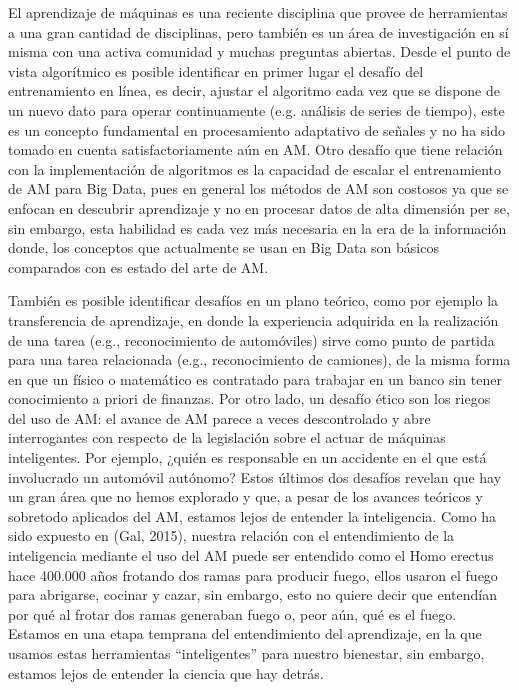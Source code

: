 El aprendizaje de máquinas es una reciente disciplina que provee de herramientas a una gran cantidad de disciplinas, pero también es un área de investigación en sí misma con una activa comunidad y muchas preguntas abiertas. Desde el punto de vista algorítmico es posible identificar en primer lugar el desafío del entrenamiento en línea, es decir, ajustar el algoritmo cada vez que se dispone de un nuevo dato para operar continuamente (e.g. análisis de series de tiempo), este es un concepto fundamental en procesamiento adaptativo de señales y no ha sido tomado en cuenta satisfactoriamente aún en AM. Otro desafío que tiene relación con la implementación de algoritmos es la capacidad de escalar el entrenamiento de AM para Big Data,  pues en general los métodos de AM son costosos ya que se enfocan en descubrir aprendizaje y no en procesar datos de alta dimensión per se, sin embargo, esta habilidad es cada vez más necesaria en la era de la información donde, los conceptos que actualmente se usan en Big Data son básicos comparados con es estado del arte de AM.

También es posible identificar desafíos en un plano teórico, como por ejemplo la transferencia de aprendizaje, en donde la experiencia adquirida en la realización de una tarea (e.g., reconocimiento de automóviles) sirve como punto de partida para una tarea relacionada (e.g., reconocimiento de camiones), de la misma forma en que un físico o matemático es contratado para trabajar en un banco sin tener conocimiento a priori de finanzas. Por otro lado, un desafío ético son los riegos del uso de AM: el avance de AM parece a veces descontrolado y abre interrogantes con respecto de la legislación sobre el actuar de máquinas inteligentes. Por ejemplo, ¿quién es responsable en un accidente en el que está involucrado un automóvil autónomo? Estos últimos dos desafíos revelan que hay un gran área que no hemos explorado y que, a pesar de los avances teóricos y sobretodo aplicados del AM, estamos lejos de entender la inteligencia. Como ha sido expuesto en (Gal, 2015), nuestra relación con el entendimiento de la inteligencia mediante el uso del AM puede ser entendido como el Homo erectus hace 400.000 años frotando dos ramas para producir fuego, ellos usaron el fuego para abrigarse, cocinar y cazar, sin embargo, esto no quiere decir que entendían por qué al frotar dos ramas generaban fuego o, peor aún, qué es el fuego. Estamos en una etapa temprana del entendimiento del aprendizaje, en la que usamos estas herramientas “inteligentes” para nuestro bienestar, sin embargo, estamos lejos de entender la ciencia que hay detrás. 
    
